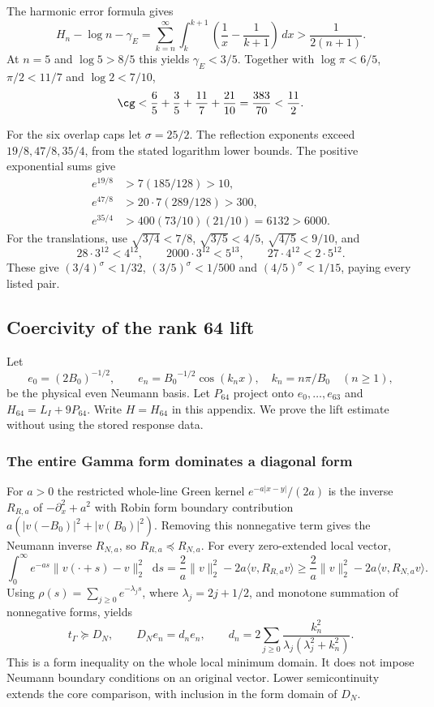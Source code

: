\documentclass[11pt,a4paper]{article}
\numberwithin{equation}{section}
\theoremstyle{definition}\newtheorem{definition}[theorem]{Definition}
\theoremstyle{remark}\newtheorem{remark}[theorem]{Remark}
\newcommand{\ip}[2]{\langle#1,#2\rangle}\newcommand{\norm}[1]{\lVert#1\rVert}\newcommand{\abs}[1]{\lvert#1\rvert}
\newcommand{\dd}{\mathop{}\!\mathrm d}\newcommand{\one}{\mathbf1}
\begin{document}
The harmonic error formula gives
\[
 H_n-\log n-\gamma_E
 =\sum_{k=n}^\infty\int_k^{k+1}\left(\frac1x-\frac1{k+1}\right)\,dx
 >\frac1{2(n+1)}.
\]
At $n=5$ and $\log5>8/5$ this yields $\gamma_E<3/5$.
Together with $\log\pi<6/5$, $\pi/2<11/7$ and $\log2<7/10$,
\[
 \cg<\frac65+\frac35+\frac{11}{7}+\frac{21}{10}
 =\frac{383}{70}<\frac{11}{2}.
\]

For the six overlap caps let $\sigma=25/2$.
The reflection exponents exceed $19/8,47/8,35/4$, from the stated logarithm lower bounds.
The positive exponential sums give
\begin{align*}
 e^{19/8}&>7(185/128)>10,\\
 e^{47/8}&>20\cdot7(289/128)>300,\\
 e^{35/4}&>400(73/10)(21/10)=6132>6000.
\end{align*}
For the translations, use
$\sqrt{3/4}<7/8$, $\sqrt{3/5}<4/5$, $\sqrt{4/5}<9/10$, and
\[
 28\cdot3^{12}<4^{12},\qquad
 2000\cdot3^{12}<5^{13},\qquad
 27\cdot4^{12}<2\cdot5^{12}.
\]
These give $(3/4)^\sigma<1/32$, $(3/5)^\sigma<1/500$ and
$(4/5)^\sigma<1/15$, paying every listed pair.


\subsection{Coercivity of the rank 64 lift}\label{c:sec:lift}
Let
\[
 e_0=(2{B_0})^{-1/2},\qquad e_n={B_0}^{-1/2}\cos(k_nx),\quad
 k_n=n\pi/{B_0}\quad(n\ge1),
\]
be the physical even Neumann basis. Let $P_{64}$ project onto
$e_0,\ldots,e_{63}$ and $H_{64}=L_I+9P_{64}$. Write $H=H_{64}$ in this appendix. We prove the lift estimate
without using the stored response data.

\subsubsection{The entire Gamma form dominates a diagonal form}
For $a>0$ the restricted whole-line Green kernel
$e^{-a\abs{x-y}}/(2a)$ is the inverse $R_{R,a}$ of
$-\partial_x^2+a^2$ with Robin form boundary contribution
$a(\abs{v(-{B_0})}^2+\abs{v({B_0})}^2)$. Removing this nonnegative term gives
the Neumann inverse $R_{N,a}$, so $R_{R,a}\preceq R_{N,a}$.
For every zero-extended local vector,
\[
 \int_0^\infty e^{-as}\norm{v(\cdot+s)-v}_2^2\dd s
 =\frac2a\norm v_2^2-2a\ip v{R_{R,a}v}
 \ge\frac2a\norm v_2^2-2a\ip v{R_{N,a}v}.
\]
Using $\rho(s)=\sum_{j\ge0}e^{-\lambda_js}$, where
$\lambda_j=2j+1/2$, and monotone summation of nonnegative forms, yields
\begin{equation}\label{c:eq:DN}
 t_\Gamma\succeq D_N,\qquad
 D_Ne_n=d_ne_n,\qquad
 d_n=2\sum_{j\ge0}\frac{k_n^2}{\lambda_j(\lambda_j^2+k_n^2)}.
\end{equation}
This is a form inequality on the whole local minimum domain. It does
not impose Neumann boundary conditions on an original vector. Lower
semicontinuity extends the core comparison, with inclusion in the
form domain of $D_N$.
\end{document}
